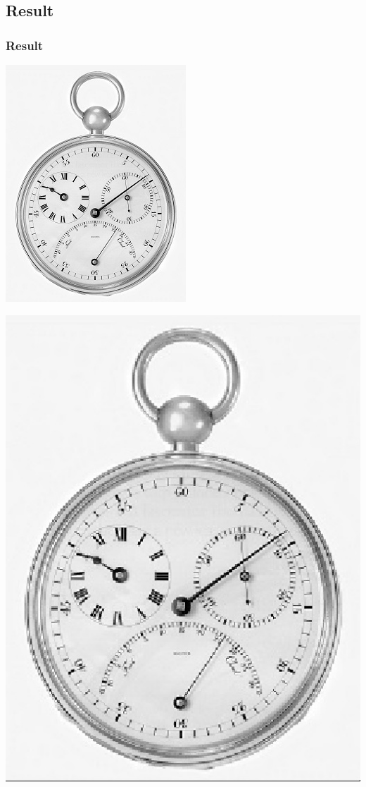 \documentclass[notheorems,serif,table,compress]{beamer}  %
\begin{document}
\subsection*{Result}
\begin{frame}
\frametitle{Result}
	\begin{minipage}[t]{0.4\linewidth}
        \centering
        \includegraphics[width=0.5\linewidth]{1.jpg} 
        \end{minipage}
	\begin{minipage}[t]{0.4\linewidth}
        \centering
        \includegraphics[width=1\linewidth]{nearest.jpg} 
        \end{minipage}

\end{frame}
\end{document}
